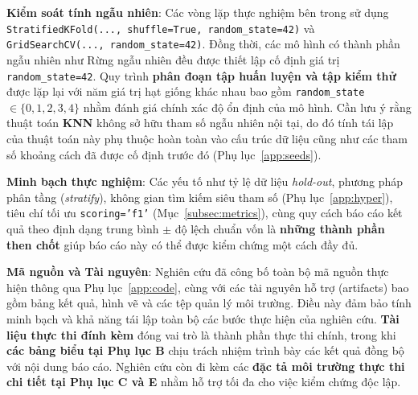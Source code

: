 \documentclass[14pt,a4paper]{extreport}
\begin{document}
\textbf{Kiểm soát tính ngẫu nhiên}: Các vòng lặp thực nghiệm bên trong sử dụng \texttt{StratifiedKFold(..., shuffle=True, random\_state=42)} và \texttt{GridSearchCV(..., random\_state=42)}. Đồng thời, các mô hình có thành phần ngẫu nhiên như Rừng ngẫu nhiên đều được thiết lập cố định giá trị \texttt{random\_state=42}. Quy trình \textbf{phân đoạn tập huấn luyện và tập kiểm thử} được lặp lại với năm giá trị hạt giống khác nhau bao gồm \texttt{random\_state} $\in\{0,1,2,3,4\}$ nhằm đánh giá chính xác độ ổn định của mô hình. Cần lưu ý rằng thuật toán \textbf{KNN} không sở hữu tham số ngẫu nhiên nội tại, do đó tính tái lập của thuật toán này phụ thuộc hoàn toàn vào cấu trúc dữ liệu cũng như các tham số khoảng cách đã được cố định trước đó (Phụ lục~\ref{app:seeds}).

\textbf{Minh bạch thực nghiệm}: Các yếu tố như tỷ lệ dữ liệu \textit{hold-out}, phương pháp phân tầng (\textit{stratify}), không gian tìm kiếm siêu tham số (Phụ lục~\ref{app:hyper}), tiêu chí tối ưu \texttt{scoring='f1'} (Mục~\ref{subsec:metrics}), cùng quy cách báo cáo kết quả theo định dạng trung bình $\pm$ độ lệch chuẩn vốn là \textbf{những thành phần then chốt} giúp báo cáo này có thể được kiểm chứng một cách đầy đủ.

\textbf{Mã nguồn và Tài nguyên}: Nghiên cứu đã công bố toàn bộ mã nguồn thực hiện thông qua Phụ lục~\ref{app:code}, cùng với các tài nguyên hỗ trợ (artifacts) bao gồm bảng kết quả, hình vẽ và các tệp quản lý môi trường. Điều này đảm bảo tính minh bạch và khả năng tái lập toàn bộ các bước thực hiện của nghiên cứu.
\textbf{Tài liệu thực thi đính kèm} đóng vai trò là thành phần thực thi chính, trong khi \textbf{các bảng biểu tại Phụ lục B} chịu trách nhiệm trình bày các kết quả đồng bộ với nội dung báo cáo. Nghiên cứu còn đi kèm các \textbf{đặc tả môi trường thực thi chi tiết tại Phụ lục C và E} nhằm hỗ trợ tối đa cho việc kiểm chứng độc lập.
\end{document}
